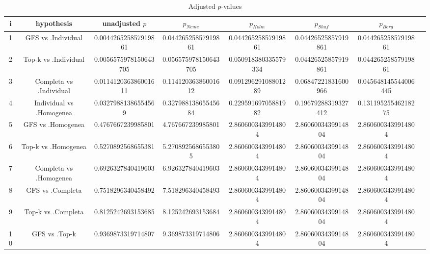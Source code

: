 \documentclass[a4paper,10pt]{article}
\begin{document}
\begin{landscape}
\begin{table}[!htp]
\centering\tiny
\caption{Adjusted $p$-values}
\begin{tabular}{cccccccc}
i&hypothesis&unadjusted $p$&$p_{Neme}$&$p_{Holm}$&$p_{Shaf}$&$p_{Berg}$\\
\hline
1&GFS vs .Individual&0.004426525857919861&0.04426525857919861&0.04426525857919861&0.04426525857919861&0.04426525857919861\\
2&Top-k vs .Individual&0.0056575978150643705&0.056575978150643705&0.050918380335579334&0.04426525857919861&0.04426525857919861\\
3&Completa vs .Individual&0.011412036386001611&0.11412036386001612&0.09129629108801289&0.06847221831600966&0.045648145544006445\\
4&Individual vs .Homogenea&0.03279881386554569&0.32798813865545684&0.22959169705881982&0.19679288319327412&0.13119525546218275\\
5&GFS vs .Homogenea&0.4767667239985801&4.767667239985801&2.8606003439914804&2.8606003439914804&2.8606003439914804\\
6&Top-k vs .Homogenea&0.5270892568655381&5.2708925686553805&2.8606003439914804&2.8606003439914804&2.8606003439914804\\
7&Completa vs .Homogenea&0.6926327840419603&6.926327840419603&2.8606003439914804&2.8606003439914804&2.8606003439914804\\
8&GFS vs .Completa&0.7518296340458492&7.518296340458493&2.8606003439914804&2.8606003439914804&2.8606003439914804\\
9&Top-k vs .Completa&0.8125242693153685&8.125242693153684&2.8606003439914804&2.8606003439914804&2.8606003439914804\\
10&GFS vs .Top-k&0.9369873319714807&9.369873319714806&2.8606003439914804&2.8606003439914804&2.8606003439914804\\
\hline
\end{tabular}
\end{table}

\end{landscape}
\end{document}

